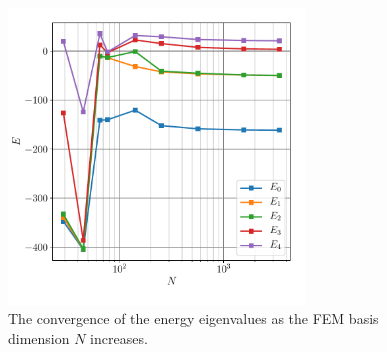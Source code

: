 \documentclass[a4paper,12pt]{article}
\begin{document}
\begin{figure}[H]
\centering
\includegraphics[width=0.7\textwidth]{../figs/energy_convergence.pdf}
\caption{The convergence of the energy eigenvalues as the FEM basis dimension $N$ increases.}
\label{fig: gaussEigVals}
\end{figure}



\end{document}
